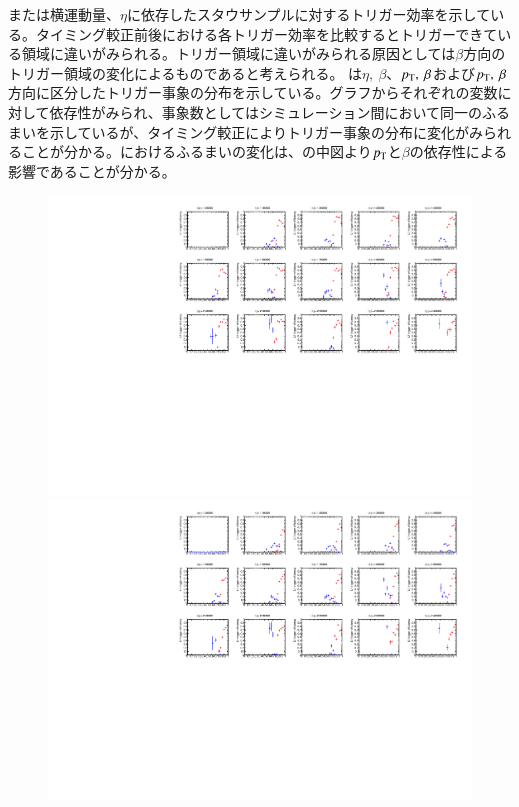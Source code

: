 または横運動量、$\eta$に依存したスタウサンプルに対するトリガー効率を示している。タイミング較正前後における各トリガー効率を比較するとトリガーできている領域に違いがみられる。トリガー領域に違いがみられる原因としては$\beta$方向のトリガー領域の変化によるものであると考えられる。
は$\eta,~\beta$、$p_{\rm{T}},~\beta$および$p_{\rm{T}},~\beta$方向に区分したトリガー事象の分布を示している。グラフからそれぞれの変数に対して依存性がみられ、事象数としてはシミュレーション間において同一のふるまいを示しているが、タイミング較正によりトリガー事象の分布に変化がみられることが分かる。におけるふるまいの変化は、の中図より$p_{\rm{T}}$と$\beta$の依存性による影響であることが分かる。 
\begin{figure}[tbp]
    \begin{minipage}{0.49\hsize}
    \centering   
    \includegraphics[width=\textwidth,page=2]{img/rec/stau_600_ori.pdf}
    \subcaption{}
    \end{minipage}
    \begin{minipage}{0.49\hsize}
    \centering   
    \includegraphics[width=\textwidth,page=2]{img/rec/stau_600.pdf}

\end{minipage}
\end{figure}
